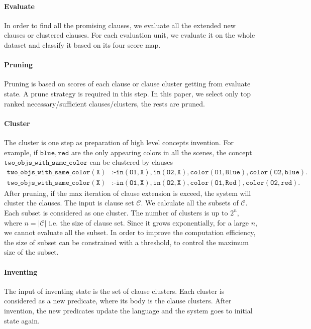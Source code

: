 \documentclass[
]{ceurart}
\begin{document}
	\paragraph{Evaluate}
	In order to find all the promising clauses, we evaluate all the extended new clauses or clustered clauses. For each evaluation unit, we evaluate it on the whole dataset and classify it based on its four score map.
	
	\paragraph{Pruning}
	Pruning is based on scores of each clause or clause cluster getting from evaluate state. A prune strategy is required in this step. In this paper, we select only top ranked necessary/sufficient clauses/clusters, the rests are pruned. 
	
	\paragraph{Cluster}
	The cluster is one step as preparation of high level concepts invention. 
	For example, if $ \mathtt{blue}, \mathtt{red} $  are the only appearing colors in all the scenes,  the concept $ \mathtt{two\_objs\_with\_same\_color} $ can be clustered by clauses 
	\begin{align*}
		\mathtt{two\_objs\_with\_same\_color(X)}&\mathtt{\texttt{:-}in(O1,X),in(O2,X),color(O1,Blue),color(O2,blue).}\\ \mathtt{two\_objs\_with\_same\_color(X)}&\mathtt{\texttt{:-}in(O1,X),in(O2,X),color(O1,Red),color(O2,red).}
	\end{align*}
	After pruning, if the max iteration of clause extension is exceed, the system will cluster the clauses. The input is clause set $ \mathcal{C} $. 
	We calculate all the subsets of $ \mathcal{C} $. Each subset is considered as one cluster. The number of clusters is up to $ 2^n $, where $ n=|\mathcal{C}| $ i.e. the size of clause set. Since it grows exponentially, for a large $ n $, we cannot evaluate all the subset. In order to improve the computation efficiency, the size of subset can be constrained with a threshold, to control the maximum size of the subset.
	
	\paragraph{Inventing}
	The input of inventing state is the set of clause clusters. Each cluster is considered as a new predicate, where its body is the clause clusters. After invention, the new predicates update the language and the system goes to initial state again.
	
\end{document}
